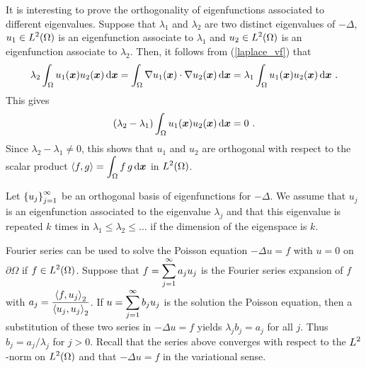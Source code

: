 It is interesting to prove the orthogonality of eigenfunctions
associated to different eigenvalues.  Suppose that $\lambda_1$ and
$\lambda_2$ are two distinct eigenvalues of $-\Delta$,
$\displaystyle u_1 \in L^2(\Omega)$ is an eigenfunction associate to 
$\lambda_1$ and $\displaystyle u_2 \in L^2(\Omega)$ is an
eigenfunction associate to $\lambda_2$.  Then, it follows from
(\ref{laplace_vf}) that
\[
\lambda_2 \int_{\Omega} u_1(\VEC{x}) u_2(\VEC{x}) \dx{\VEC{x}} =
\int_{\Omega} \nabla u_1(\VEC{x}) \cdot \nabla u_2(\VEC{x}) \dx{\VEC{x}}
= \lambda_1 \int_{\Omega} u_1(\VEC{x}) u_2(\VEC{x}) \dx{\VEC{x}} \ .
\]
This gives
\[
\left( \lambda_2 - \lambda_1 \right) \int_{\Omega} u_1({\bm{x}})
u_2({\bm{x}}) \,\mathrm{d}{{\bm{x}}} = 0 \ .
\]
Since $\lambda_2 - \lambda_1 \neq 0$, this shows that $u_1$ and $u_2$
are orthogonal with respect to the scalar product
$\displaystyle \left\langle{f} , {g}\right\rangle = \int_{\Omega} f\, g \,\mathrm{d}{{\bm{x}}}$
in $\displaystyle L^2(\Omega)$.

Let $\displaystyle \left\{ u_j \right\}_{j=1}^\infty$ be an orthogonal basis of
eigenfunctions for $-\Delta$.  We assume that $u_j$ is an
eigenfunction associated to the eigenvalue $\lambda_j$ and that this
eigenvalue is repeated $k$ times in
$\lambda_1 \leq \lambda_2 \leq \ldots$ if the dimension of the
eigenspace is $k$.

\begin{egg}
Fourier series can be used to solve the Poisson equation
$-\Delta u = f$ with $u =0$ on $\partial \Omega$
if $\displaystyle f \in L^2(\Omega)$.  Suppose that
$\displaystyle f = \sum_{j=1}^\infty a_j u_j$ is the Fourier series
expansion of $f$ with
$\displaystyle a_j = \frac{\left\langle{f} , {u_j}\right\rangle_2}{\left\langle{u_j} , {u_j}\right\rangle_2}$.  If 
$\displaystyle u = \sum_{j=1}^\infty b_j u_j$ is the solution
the Poisson equation, then a substitution of these two series in
$-\Delta u = f$ yields $\lambda_j b_j = a_j$ for all $j$.
Thus $b_j = a_j/\lambda_j$ for $j>0$.   Recall that the
series above converges with respect to the $\displaystyle L^2$-norm on
$\displaystyle L^2(\Omega)$ and that $-\Delta u = f$ in the variational sense.
\end{egg}

